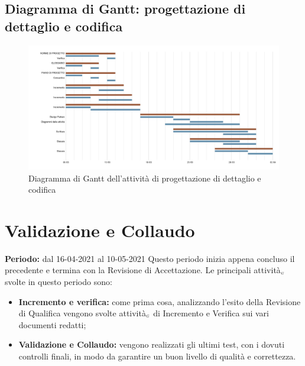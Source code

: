 \subsection{Diagramma di Gantt: progettazione di dettaglio e codifica}\label{PianificazioneDiagrammaDiGanttProgettazioneDettaglio}
\begin{figure}[!h]
	\begin{center}
		\includegraphics[width=0.8\linewidth]{../immagini/pdp/gantt_progettazione_dettaglio.png}
		\caption{Diagramma di Gantt dell'attività di progettazione di dettaglio e codifica}
	\end{center}
\end{figure}
\section{Validazione e Collaudo}\label{PianificazioneValidazione}
\textbf{Periodo:} dal 16-04-2021 al 10-05-2021
Questo periodo inizia appena concluso il precedente e termina con la Revisione di Accettazione.
Le principali attività$_{\scaleto{G}{3pt}}$ svolte in questo periodo sono:
\begin{itemize}
	\item \textbf{Incremento e verifica:} come prima cosa, analizzando l'esito della Revisione di Qualifica vengono svolte attività$_{\scaleto{G}{3pt}}$ di Incremento e Verifica sui vari documenti redatti;
	\item \textbf{Validazione e Collaudo:} vengono realizzati gli ultimi test, con i dovuti controlli finali, in modo da garantire un buon livello di qualità e correttezza.
\end{itemize}
